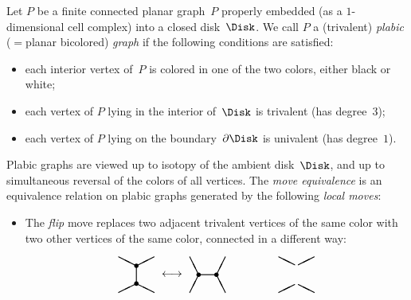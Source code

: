 \begin{definition}
\label{def:plabic}
Let $P$ be a finite connected planar graph~$P$ properly embedded
(as a $1$-dimensional cell complex) into a closed disk~$\Disk$. 
We call $P$ a (trivalent) \emph{plabic} ($=$planar bicolored) \emph{graph}
if the following conditions are satisfied: 
\begin{itemize} %
\item
each interior vertex of~$P$ is colored in one of the two colors, either black or white; 
\item
each vertex of $P$ lying in the interior of~$\Disk$ is trivalent 
(\ie has degree~$3$);
\item 
each vertex of $P$ lying on the boundary~$\partial\Disk$ is univalent 
(\ie has degree~$1$). 
\end{itemize}
Plabic graphs are viewed up to isotopy of the ambient disk~$\Disk$, 
and up to simultaneous reversal of the colors of all vertices. 
The \emph{move equivalence} is an equivalence relation on plabic graphs 
generated by the following \emph{local moves}: 
\begin{itemize} %
\item The \emph{flip} move replaces two adjacent trivalent vertices of
 the same color with two other vertices of the same color, connected
 in a different way:
\[ 
\setlength{\unitlength}{0.8pt}
\begin{picture}(40,45)(0,0)
\thicklines
\put(0,0){\line(2,1){20}}
\put(20,30){\line(2,1){20}}
\put(0,40){\line(2,-1){20}}
\put(20,10){\line(2,-1){20}}
\put(20,10){\line(0,1){20}}
\put(20,10){\circle*{5}}
\put(20,30){\circle*{5}}
\end{picture}
\begin{picture}(40,40)(0,0)
\put(20,20){\makebox(0,0){$\longleftrightarrow$}}
\end{picture}
\begin{picture}(40,40)(0,0)
\thicklines
\put(0,0){\line(1,2){10}}
\put(30,20){\line(1,2){10}}
\put(40,0){\line(-1,2){10}}
\put(10,20){\line(-1,2){10}}
\put(10,20){\line(1,0){20}}
\put(10,20){\circle*{5}}
\put(30,20){\circle*{5}}
\end{picture}
\begin{picture}(60,40)(0,0)
\end{picture}
\begin{picture}(40,40)(0,0)
\thicklines
\put(0,0){\line(2,1){18}}
\put(40,40){\line(-2,-1){18}}
\put(0,40){\line(2,-1){18}}
\put(40,0){\line(-2,1){18}}

\end{picture}\]
\end{itemize}
\end{definition}
